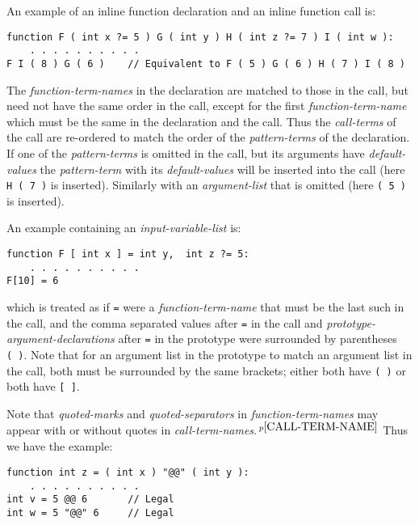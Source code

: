 \documentclass[12pt]{article}
\newcommand{\pagnote}[1]{$\,^{p\pageref{#1}}$}
\newenvironment{indpar}[1][0.3in]%
	{\begin{list}{}%
		     {\setlength{\itemsep}{0in}%
		      \setlength{\topsep}{0in}%
		      \setlength{\parsep}{1ex}%
		      \setlength{\labelwidth}{#1}%
		      \setlength{\leftmargin}{#1}%
		      \addtolength{\leftmargin}{\labelsep}}%
	 \item}%
	{\end{list}}
\begin{document}
An example of an inline function declaration and an inline function call is:
\begin{indpar}\begin{verbatim}
function F ( int x ?= 5 ) G ( int y ) H ( int z ?= 7 ) I ( int w ):
    . . . . . . . . . .
F I ( 8 ) G ( 6 )    // Equivalent to F ( 5 ) G ( 6 ) H ( 7 ) I ( 8 )
\end{verbatim}\end{indpar}

The {\em function-term-names} in the declaration are matched to those
in the call, but need not have the same order in the call, except for
the first {\em function-term-name} which must be the same in the
declaration and the call.  Thus the {\em call-terms} of the call
are re-ordered to match the order of the {\em pattern-terms} of the
declaration.  If one of the {\em pattern-terms} is omitted in the
call, but its arguments have {\em default-values}
the {\em pattern-term} with its
{\em default-values} will be inserted into the call
(here {\tt H ( 7 )} is inserted).
Similarly with an {\em argument-list} that is omitted
(here {\tt ( 5 )} is inserted).

An example containing an {\em input-variable-list} is:
\begin{indpar}\begin{verbatim}
function F [ int x ] = int y,  int z ?= 5:
    . . . . . . . . . .
F[10] = 6
\end{verbatim}\end{indpar}
which is treated as if {\tt =} were a {\em function-term-name}
that must be the last such in the call, and the comma separated
values after {\tt =}
in the call and {\em prototype-argument-declarations} after {\tt =}
in the prototype
were surrounded by parentheses {\tt (~)}.  Note that for an argument
list in the prototype to match an argument list in the call, both
must be surrounded by the same brackets; either both have {\tt (~)}
or both have {\tt [~]}.

Note that {\em quoted-marks} and {\em quoted-separators}
in {\em function-term-names} may appear with or without quotes in
{\em call-term-names}.\pagnote{CALL-TERM-NAME}  Thus we have the example:
\begin{indpar}\begin{verbatim}
function int z = ( int x ) "@@" ( int y ):
    . . . . . . . . . .
int v = 5 @@ 6       // Legal
int w = 5 "@@" 6     // Legal
\end{verbatim}\end{indpar}
\end{document}
